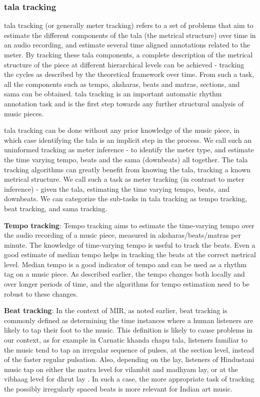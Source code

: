\subsubsection{\Gls{tala} tracking}
\Gls{tala} tracking (or generally meter tracking) refers to a set of problems that aim to estimate the different components of the \gls{tala} (the metrical structure) over time in an audio recording, and estimate several time aligned annotations related to the meter. By tracking these \gls{tala} components, a complete description of the metrical structure of the piece at different hierarchical levels can be achieved - tracking the cycles as described by the theoretical framework over time. From such a task, all the components such as tempo, \glspl{akshara}, beats and \glspl{matra}, sections, and \gls{sama} can be obtained. \Gls{tala} tracking is an important automatic rhythm annotation task and is the first step towards any further structural analysis of music pieces. 

\Gls{tala} tracking can be done without any prior knowledge of the music piece, in which case identifying the \gls{tala} is an implicit step in the process. We call such an uninformed tracking as meter inference - to identify the meter type, and estimate the time varying tempo, beats and the \gls{sama} (downbeats) all together. The \gls{tala} tracking algorithms can greatly benefit from knowing the \gls{tala}, tracking a known metrical structure. We call such a task as meter tracking (in contrast to meter inference) - given the \gls{tala}, estimating the time varying tempo, beats, and downbeats. We can categorize the sub-tasks in \gls{tala} tracking as tempo tracking, beat tracking, and \gls{sama} tracking. 

\textbf{Tempo tracking}: Tempo tracking aims to estimate the time-varying tempo over the audio recording of a music piece, measured in \glspl{akshara}/beats/\glspl{matra} per minute. The knowledge of time-varying tempo is useful to track the beats. Even a good estimate of median tempo helps in tracking the beats at the correct metrical level. Median tempo is a good indicator of tempo and can be used as a rhythm tag on a music piece. As described earlier, the tempo changes both locally and over longer periods of time, and the algorithms for tempo estimation need to be robust to these changes. 

\textbf{Beat tracking}: In the context of \gls{MIR}, as noted earlier, beat tracking is commonly defined as determining the time instances where a human listeners are likely to tap their foot to the music. This definition is likely to cause problems in our context, as for example in Carnatic \gls{khanda chapu} \gls{tala}, listeners familiar to the music tend to tap an irregular sequence of pulses, at the section level, instead of the faster regular pulsation. Also, depending on the \gls{lay}, listeners of Hindustani music tap on either the \gls{matra} level for \gls{vilambit} and \gls{madhyam} \gls{lay}, or at the \gls{vibhaag} level for \gls{dhrut} \gls{lay} \cite[p.~91]{clayton:00:time}. In such a case, the more appropriate task of tracking the possibly irregularly spaced beats is more relevant for Indian art music.

